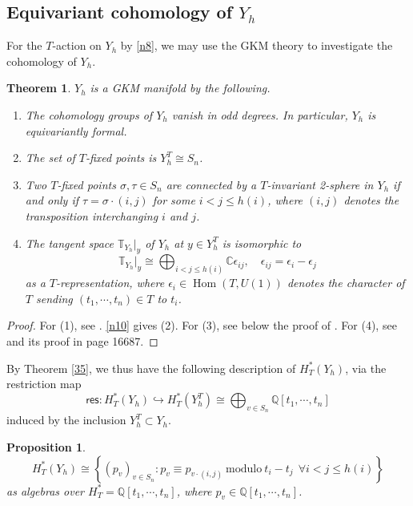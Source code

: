 \documentclass[11pt]{article}
\newtheorem{proposition}[theo]{Proposition}
\newtheorem{theorem}[theo]{Theorem}
\theoremstyle{definition}
\numberwithin{equation}{section}
\numberwithin{equation}{section}
\newcommand{\Q}{\mathbb{Q}}
\newcommand{\C}{\mathbb{C}}
\newcommand\QQ{\mathbb{Q}}
\DeclareMathOperator{\Hom}{Hom}
\newcommand\beq{\begin{equation}}
\newcommand\eeq{\end{equation}}
\newcommand\res{\mathsf{res}}
\begin{document}
\subsection{Equivariant cohomology of \texorpdfstring{$Y_h$}{Yh}}
For the $T$-action on $Y_h$ by \eqref{n8}, we may use the GKM theory to investigate the cohomology of $Y_h$. 


\begin{theorem} \label{34}
	$Y_h$ is a GKM manifold by the following.
	\begin{enumerate}
	\item The cohomology groups of $Y_h$ vanish in odd degrees. In particular, $Y_h$ is equivariantly formal.
	\item The set of $T$-fixed points is $Y_h^T\cong S_n$.
	\item Two $T$-fixed points $\sigma, \tau \in S_n$ are connected by a $T$-invariant 2-sphere in $Y_h$ if and only if $\tau=\sigma\cdot (i,j)$ for some $i<j\leq h(i)$, where  
		$(i,j)$ denotes the transposition interchanging $i$ and $j$.
	\item The tangent space $\mathbb{T}_{Y_h}|_y$ of $Y_h$ at $y\in Y_h^T$ is isomorphic to 
\[\mathbb{T}_{Y_h}|_y \cong \bigoplus_{i<j\leq h(i)}\C \epsilon_{ij}, \quad \epsilon_{ij}=\epsilon_i-\epsilon_j\]
 as a $T$-representation, where $\epsilon_i\in \Hom(T,U(1))$ denotes the character of $T$ sending $(t_1,\cdots,t_n)\in T$ to $t_i$.
\end{enumerate}
\end{theorem}

\begin{proof}
	For (1), see \cite[Theorem 3.5 and Remark 3.7]{AB}. \eqref{n10} gives (2). 
	For (3), see below the proof of \cite[Proposition 3.9]{AB}.
	For (4), see \cite[Proposition 3.9]{AB} and its proof in page 16687. 
\end{proof}
By Theorem \ref{35}, we thus have the following description of $H^*_T(Y_h)$, via the  restriction map
\beq \res:H^*_T(Y_h)\hookrightarrow H^*_T(Y_h^T)\cong \bigoplus_{v\in S_n}\QQ[t_1,\cdots, t_n]\eeq
induced by the inclusion $Y_h^T\subset Y_h$.
\begin{proposition}\label{n32} \cite[Proposition 5.3]{AB}
\beq \label{6} H^*_T(Y_h)\cong \left \{(p_v)_{v\in S_n}:  
p_v\equiv p_{v\cdot (i,j)} \mathrm{~modulo~} t_i-t_j \ \ \forall  i<j\leq h(i)\right \}\eeq
 as algebras over $H^*_T=\Q[t_1,\cdots, t_n]$, where $p_v\in \Q[t_1,\cdots, t_n]$.
 \end{proposition}
\end{document}
